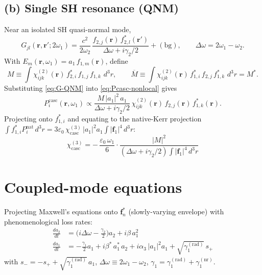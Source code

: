 \documentclass[11pt,a4paper]{article}
\newcommand{\eps}{\varepsilon}
\newcommand{\bvec}[1]{\mathbf{#1}}
\newcommand{\f}{\bvec{f}}
\newcommand{\ri}{\bvec{r}}
\newcommand{\dthreer}{\,d^{3}r}
\newcommand{\chitwo}{\chi^{(2)}}
\newcommand{\chithree}{\chi^{(3)}}
\newcommand{\Dom}{\Delta\omega}
\begin{document}
\subsection*{(b) Single SH resonance (QNM)}
Near an isolated SH quasi-normal mode,
\begin{equation}
  G_{jl}(\ri,\ri';2\omega_1)=
  \frac{c^2}{2\omega_2}\,
  \frac{f_{2,j}(\ri)\,f_{2,l}^*(\ri')}{\Dom+i\gamma_2/2}+(\text{bg}),
  \qquad \Dom=2\omega_1-\omega_2.
\label{eq:G-QNM}
\end{equation}
With $E_m(\ri,\omega_1)=a_1\,f_{1,m}(\ri)$, define
\begin{equation}
  M\equiv\!\int\!\chitwo_{ijk}(\ri)\,f_{2,i}^*\,f_{1,j}\,f_{1,k}\,\dthreer,
  \qquad
  \overline M\equiv\!\int\!\chitwo_{ijk}(\ri)\,f_{1,i}^*\,f_{2,j}\,f_{1,k}^*\,\dthreer=M^*.
  \label{eq:M-overline-M}
\end{equation}
Substituting \eqref{eq:G-QNM} into \eqref{eq:Pcasc-nonlocal} gives
\begin{equation}
  P_i^{\text{casc}}(\ri,\omega_1)\propto
    \frac{M\,|a_1|^{2}\,a_1}{\Dom+i\gamma_2/2}\,
    \chitwo_{ijk}(\ri)\,f_{2,j}(\ri)\,f_{1,k}^{*}(\ri).
  \label{eq:Pcasc-modal}
\end{equation}
Projecting onto $f_{1,i}^*$ and equating to the native-Kerr projection
$\int f_{1,i}^* P_i^\text{nat}\dthreer=3\eps_0\,\chithree_\text{casc}\,|a_1|^2 a_1\!\int|\f_1|^4\dthreer$:
\begin{equation}
  \boxed{\;\chithree_{\text{casc}}=
    -\,\frac{\eps_0\,\omega_1}{6}\cdot
    \frac{|M|^2}{(\Dom+i\gamma_2/2)\!\int\!|\f_1|^4\dthreer}\;}
  \label{eq:chi3casc-tensor}
\end{equation}

\section{Coupled-mode equations}\label{sec:tcmt}

Projecting Maxwell's equations onto $\f_n^*$ (slowly-varying envelope) with phenomenological loss rates:
\begin{align}
  \frac{da_2}{dt}&=\bigl(i\Dom-\tfrac{\gamma_2}{2}\bigr)a_2+i\beta\,a_1^2\label{eq:a2}\\[2pt]
  \frac{da_1}{dt}&=-\tfrac{\gamma_1}{2}a_1+i\beta^*\,a_1^*\,a_2+i\alpha_3\,|a_1|^2 a_1+\sqrt{\gamma_1^{(\text{rad})}}\,s_+\label{eq:a1}
\end{align}
with $s_-=-s_++\sqrt{\gamma_1^{(\text{rad})}}\,a_1$, $\Dom\equiv 2\omega_1-\omega_2$, $\gamma_1=\gamma_1^{(\text{rad})}+\gamma_1^{(\text{nr})}$.
\end{document}
